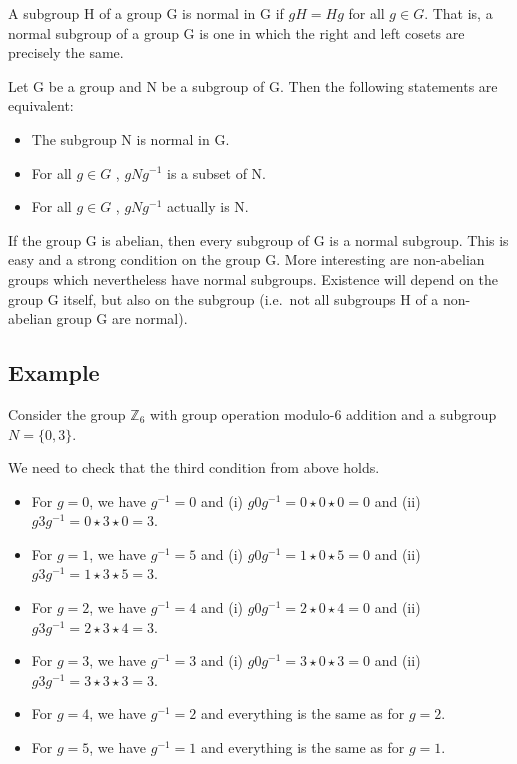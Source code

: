 
A subgroup H of a group G is normal in G if \(gH = Hg\) for all
\(g \in G\). That is, a normal subgroup of a group G is one in which the
right and left cosets are precisely the same.

Let G be a group and N be a subgroup of G. Then the following statements
are equivalent:

\begin{itemize}

\item
  The subgroup N is normal in G.
\item
  For all \(g \in G\) , \(gNg^{-1}\) is a subset of N.
\item
  For all \(g \in G\) , \(gNg^{-1}\) actually is N.
\end{itemize}

If the group G is abelian, then every subgroup of G is a normal
subgroup. This is easy and a strong condition on the group G. More
interesting are non-abelian groups which nevertheless have normal
subgroups. Existence will depend on the group G itself, but also on the
subgroup (i.e.~not all subgroups H of a non-abelian group G are normal).

\subsection{Example}\label{example}

Consider the group \(\mathbb{Z}_6\) with group operation modulo-6
addition and a subgroup \(N=\{0,3\}\).

We need to check that the third condition from above holds.

\begin{itemize}
\item
  For \(g=0\), we have \(g^{-1}=0\) and (i)
  \(g 0 g^{-1}=0 \star 0 \star 0=0\) and (ii)
  \(g 3 g^{-1}=0 \star 3 \star 0 = 3\).
\item
  For \(g=1\), we have \(g^{-1}=5\) and (i)
  \(g 0 g^{-1}=1 \star 0 \star 5=0\) and (ii)
  \(g 3 g^{-1}=1 \star 3 \star 5 = 3\).
\item
  For \(g=2\), we have \(g^{-1}=4\) and (i)
  \(g 0 g^{-1}=2 \star 0 \star 4=0\) and (ii)
  \(g 3 g^{-1}=2 \star 3 \star 4 = 3\).
\item
  For \(g=3\), we have \(g^{-1}=3\) and (i)
  \(g 0 g^{-1}=3 \star 0 \star 3=0\) and (ii)
  \(g 3 g^{-1}=3 \star 3 \star 3 = 3\).
\item
  For \(g=4\), we have \(g^{-1}=2\) and everything is the same as for
  \(g=2\).
\item
  For \(g=5\), we have \(g^{-1}=1\) and everything is the same as for
  \(g=1\).
\end{itemize}

